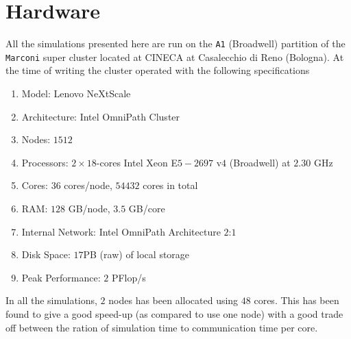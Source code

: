 \section{Hardware}
%
All the simulations presented here are run on the \texttt{A1} (Broadwell) partition of the \texttt{Marconi} super cluster located at CINECA at Casalecchio di Reno (Bologna).
At the time of writing the cluster operated with the following specifications \cite{Marconi2016Web}
%
\begin{enumerate}[noitemsep]
    \item Model: Lenovo NeXtScale
    \item Architecture: Intel OmniPath Cluster
    \item Nodes: $1512$
    \item Processors: $2\times18$-cores Intel Xeon E$5-2697$ v$4$ (Broadwell) at $2.30$ GHz
    \item Cores: $36$ cores/node, $54432$ cores in total
    \item RAM: $128$ GB/node, $3.5$ GB/core
    \item Internal Network: Intel OmniPath Architecture $2$:$1$
    \item Disk Space: $17$PB (raw) of local storage
    \item Peak Performance: $2$ PFlop/s
\end{enumerate}
%
In all the simulations, $2$ nodes has been allocated using $48$ cores.
This has been found to give a good speed-up (as compared to use one node) with a good trade off between the ration of simulation time to communication time per core.
